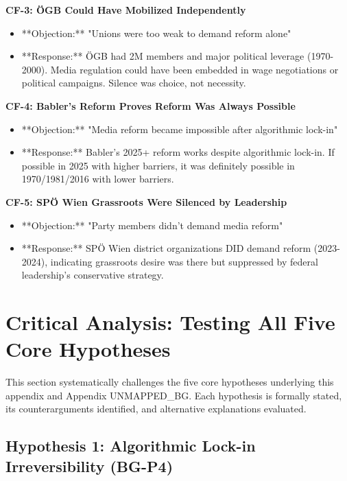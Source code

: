 \textbf{CF-3: ÖGB Could Have Mobilized Independently}
\begin{itemize}
\item **Objection:** "Unions were too weak to demand reform alone"
\item **Response:** ÖGB had 2M members and major political leverage (1970-2000). Media regulation could
  have been embedded in wage negotiations or political campaigns. Silence was choice, not necessity.
\end{itemize}

\textbf{CF-4: Babler's Reform Proves Reform Was Always Possible}
\begin{itemize}
\item **Objection:** "Media reform became impossible after algorithmic lock-in"
\item **Response:** Babler's 2025+ reform works despite algorithmic lock-in. If possible in 2025 with
  higher barriers, it was definitely possible in 1970/1981/2016 with lower barriers.
\end{itemize}

\textbf{CF-5: SPÖ Wien Grassroots Were Silenced by Leadership}
\begin{itemize}
\item **Objection:** "Party members didn't demand media reform"
\item **Response:** SPÖ Wien district organizations DID demand reform (2023-2024), indicating grassroots
  desire was there but suppressed by federal leadership's conservative strategy.
\end{itemize}


\section*{Critical Analysis: Testing All Five Core Hypotheses}

This section systematically challenges the five core hypotheses underlying this appendix and Appendix UNMAPPED_BG.
Each hypothesis is formally stated, its counterarguments identified, and alternative explanations evaluated.

\subsection*{Hypothesis 1: Algorithmic Lock-in Irreversibility (BG-P4)}

